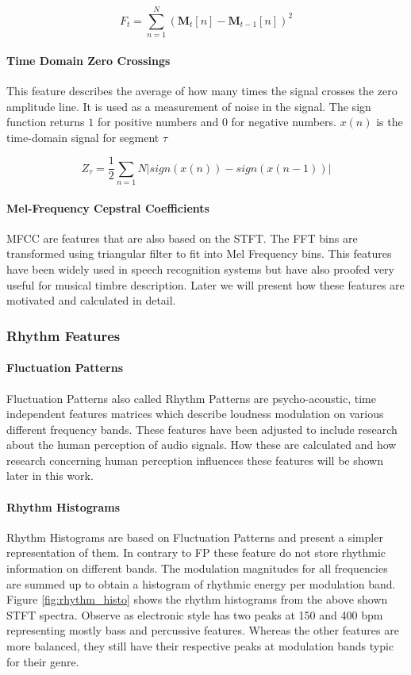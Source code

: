 \documentclass[cic,tc,english]{iiufrgs}
\begin{document}
\begin{equation}
 F_{t} = \sum_{n=1}^N (\bm{M}_t[n] - \bm{M}_{t-1}[n])^2
\end{equation} 

\paragraph{Time Domain Zero Crossings}
This feature describes the average of how many times the signal crosses the zero amplitude line. It is used as a measurement of noise in the signal. The sign function returns $1$ for positive numbers and $0$ for negative numbers. $x(n)$ is the time-domain signal for segment $\tau$ 

\begin{equation}
Z_\tau = \frac{1}{2}\sum_{n=1}{N}\vert sign(x(n)) - sign(x(n-1))\vert
\end{equation}

\paragraph{Mel-Frequency Cepstral Coefficients}
MFCC are features that are also based on the STFT. The FFT bins are transformed using triangular filter to fit into Mel Frequency bins. This features have been widely used in speech recognition systems but have also proofed very useful for musical timbre description\cite{logan2000mel}. Later we will present how these features are motivated and calculated in detail.

\subsubsection{Rhythm Features}

\paragraph{Fluctuation Patterns}
Fluctuation Patterns also called Rhythm Patterns are psycho-acoustic, time independent features matrices which describe loudness modulation on various different frequency bands\cite{rauber2002using}. These features have been adjusted to include research about the human perception of audio signals. How these are calculated and how research concerning human perception influences these features will be shown later in this work.

\paragraph{Rhythm Histograms}
Rhythm Histograms are based on Fluctuation Patterns and present a simpler representation of them\cite{lidy2005evaluation}. In contrary to FP these feature do not store rhythmic information on different bands. The modulation magnitudes for all frequencies are summed up to obtain a histogram of rhythmic energy per modulation band. Figure \ref{fig:rhythm_histo} shows the rhythm histograms from the above shown STFT spectra. Observe as electronic style has two peaks at 150 and 400 bpm representing mostly bass and percussive features. Whereas the other features are more balanced, they still have their respective peaks at modulation bands typic for their genre. 
\end{document}
